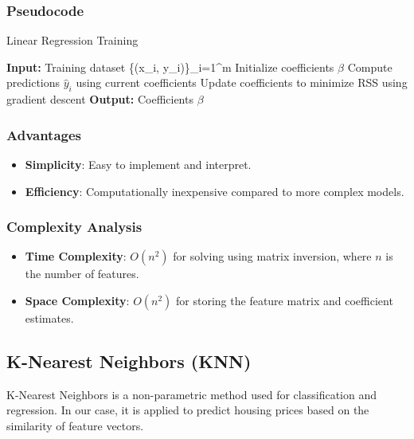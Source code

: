 \documentclass[10pt,conference,compsoc]{IEEEtran}
\begin{document}
{\subsubsection{Pseudocode}

\begin{algorithm}
\caption{Linear Regression Training}
\begin{algorithmic}[1]
\STATE \textbf{Input:} Training dataset \{(x_i, y_i)\}_{i=1}^m
\STATE Initialize coefficients \(\beta\)
\REPEAT
    \STATE Compute predictions \(\hat{y}_i\) using current coefficients
    \STATE Update coefficients to minimize RSS using gradient descent
\STATE \textbf{Output:} Coefficients \(\beta\)
\end{algorithmic}
\end{algorithm}

\subsubsection{Advantages}

\begin{itemize}
    \item \textbf{Simplicity}: Easy to implement and interpret.
    \item \textbf{Efficiency}: Computationally inexpensive compared to more complex models.
\end{itemize}

\subsubsection{Complexity Analysis}

\begin{itemize}
    \item \textbf{Time Complexity}: \(O(n^2)\) for solving using matrix inversion, where \(n\) is the number of features.
    \item \textbf{Space Complexity}: \(O(n^2)\) for storing the feature matrix and coefficient estimates.
\end{itemize}

\subsection{K-Nearest Neighbors (KNN)}

K-Nearest Neighbors is a non-parametric method used for classification and regression. In our case, it is applied to predict housing prices based on the similarity of feature vectors.

}
\end{document}
